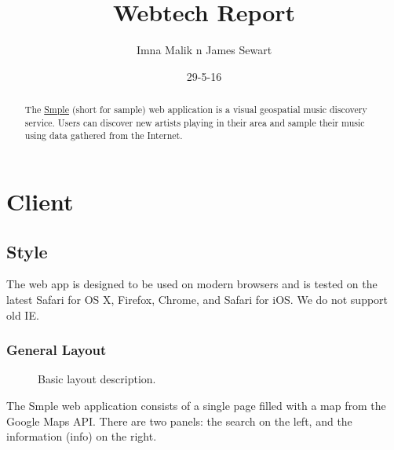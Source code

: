 \documentclass[10pt]{article}
\title{Webtech Report}
\author{Imna Malik n James Sewart}
\date{29-5-16}
\begin{document}
    \maketitle

    \tableofcontents


    \begin{abstract}
        The \href{https://smple.uk}{Smple} (short for sample) web application is a visual geospatial music discovery service. Users can discover new artists playing in their area and sample their music using data gathered from the Internet.
    \end{abstract}

    \section{Client}
        \subsection{Style}
            The web app is designed to be used on modern browsers and is tested on the latest Safari for OS X, Firefox, Chrome, and Safari for iOS. We do not support old IE.
            \subsubsection{General Layout}
                \begin{figure}[!ht]
                  \centering
                  \caption{Basic layout description.}
                \end{figure}

                The Smple web application consists of a single page filled with a map from the Google Maps API. There are two panels: the search on the left, and the information (info) on the right. 
\end{document}
